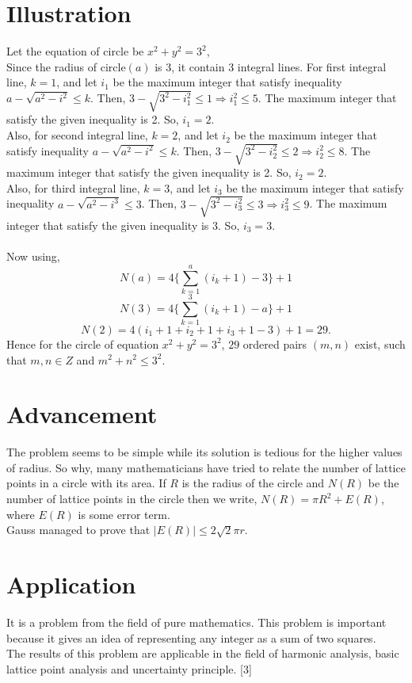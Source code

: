 \documentclass[journal,twoside]{IEEEtran}
\begin{document}
\section{Illustration}
Let the equation of circle be $x^{2}+y^{2}=3^{2}$,
\\Since the radius of circle$(a)$ is 3, it contain 3 integral lines. For first integral line, $k=1$, and let $i_{1}$ be the maximum integer that satisfy inequality $a- \sqrt{a^{2}-i^{2}} \leq k$. Then, $3- \sqrt{3^{2}-i_{1}^{2}} \leq 1 \Rightarrow i_{1}^{2} \leq 5 $. The maximum integer that satisfy the given inequality is 2. So, $i_{1}=2$.
\\Also, for second integral line, $k=2$, and let $i_{2}$ be the maximum integer that satisfy inequality $a- \sqrt{a^{2}-i^{2}} \leq k$. Then, $3- \sqrt{3^{2}-i_{2}^{2}} \leq 2 \Rightarrow i_{2}^{2} \leq 8 $. The maximum integer that satisfy the given inequality is 2. So, $i_{2}=2$.
\\Also, for third integral line, $k=3$, and let $i_{3}$ be the maximum integer that satisfy inequality $a- \sqrt{a^{2}-i^{3}} \leq 3$. Then, $3- \sqrt{3^{2}-i_{3}^{2}} \leq 3 \Rightarrow i_{3}^{2} \leq 9 $. The maximum integer that satisfy the given inequality is 3. So, $i_{3}=3$.
\\\\Now using, $$N(a)=4\bigg\{\sum_{k=1}^{a}(i_{k}+1)-3\bigg\}+1$$
$$N(3)=4\bigg\{\sum_{k=1}^{3}(i_{k}+1)-a\bigg\}+1$$
$$N(2)=4(i_{1}+1+i_{2}+1+i_{3}+1-3)+1= 29.$$
Hence for the circle of equation $x^{2}+y^{2}=3^{2}$, $29$ ordered pairs $(m,n)$ exist, such that $m,n \in Z$ and $m^{2}+n^{2} \leq 3^{2}$.

\section{Advancement}
The problem seems to be simple while its solution is tedious for the higher values of radius.
So why, many mathematicians have tried to relate the number of lattice points in a circle with its area. If $R$ is the radius of the circle and $N(R)$ be the number of lattice points in the circle then we write, $N(R) = \pi R^{2} + E(R)$, where $E(R)$ is some error term. 
\\Gauss managed to prove that $|E(R)| \leq 2\sqrt{2}\pi r.$

\section{Application}
It is a problem from the field of pure mathematics. This problem is important because it gives an idea of representing any integer as a sum of two squares. 
\\The results of this problem are applicable in the field of harmonic analysis, basic lattice point analysis and uncertainty principle. [3] 
\end{document}
